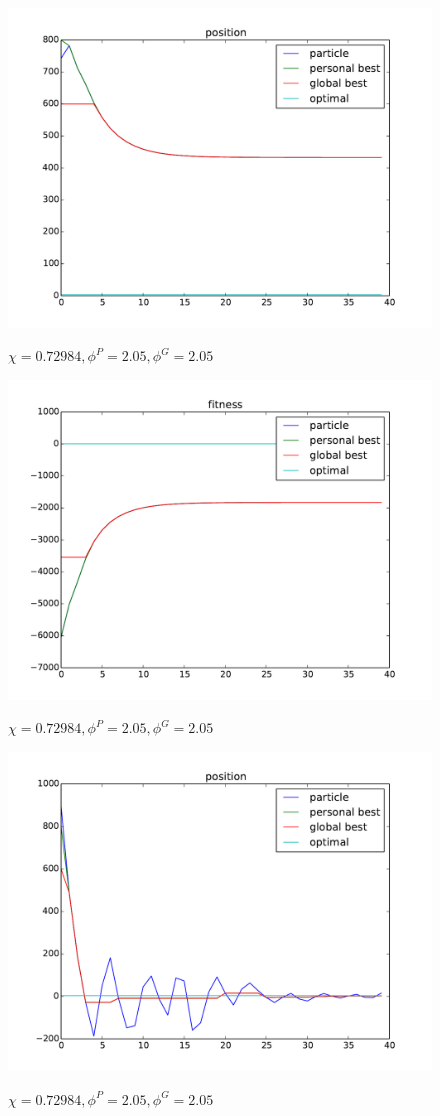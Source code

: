 \begin{figure}[ht]
\centering
\includegraphics[width=.7\linewidth]{./simfig/case1/position1-1} 
\label{fig:case1-1:position}
\caption{$ \chi = 0.72984 , \phi^{P} = 2.05 , \phi^{G} = 2.05 $ }
\end{figure}

\begin{figure}[ht]
\centering
\includegraphics[width=.7\linewidth]{./simfig/case1/fitness1-1} 
\label{fig:case1-1:fitness}
\caption{$ \chi = 0.72984 , \phi^{P} = 2.05 , \phi^{G} = 2.05 $ }
\end{figure}

\begin{figure}[ht]
\centering
\includegraphics[width=.7\linewidth]{./simfig/case1/position1-2} 
\label{fig:case1-2:position}
\caption{$ \chi = 0.72984 , \phi^{P} = 2.05 , \phi^{G} = 2.05 $ }
\end{figure}
  
